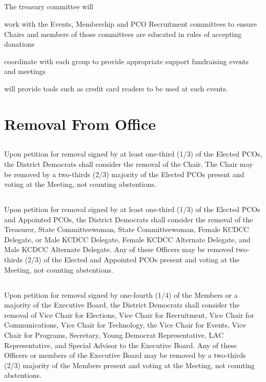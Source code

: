 \subsection{}
The treasury committee will
\begin{inlinealphalist}
    \item work with the Events, Membership and PCO Recruitment committees to ensure Chairs and members of those committees are educated in rules of accepting donations
    \item coordinate with each group to provide appropriate support fundraising events and meetings
    \item will provide tools such as credit card readers to be used at such events.
\end{inlinealphalist}

\section{Removal From Office}
\subsection{}
Upon petition for removal signed by at least one-third (1/3) of the Elected PCOs, the \fortythird{} District Democrats shall consider the removal of the Chair. The Chair may be removed by a two-thirds (2/3) majority of the Elected PCOs present and voting at the Meeting, not counting abstentions.

\subsection{}
Upon petition for removal signed by at least one-third (1/3) of the Elected PCOs and Appointed PCOs, the \fortythird{} District Democrats shall consider the removal of the Treasurer, State Committeewoman, State Committeewoman, Female KCDCC Delegate, or Male KCDCC Delegate, Female KCDCC Alternate Delegate, and Male KCDCC Alternate Delegate. Any of these Officers may be removed two-thirds (2/3) of the Elected and Appointed PCOs present and voting at the Meeting, not counting abstentions.

\subsection{} \label{eb-removal}
Upon petition for removal signed by one-fourth (1/4) of the Members or a majority of the Executive Board, the \fortythird{} District Democrats shall consider the removal of Vice Chair for Elections, Vice Chair for Recruitment, Vice Chair for Communications, Vice Chair for Technology, the Vice Chair for Events, Vice Chair for Programs, Secretary, Young Democrat Representative, LAC Representative, and Special Advisor to the Executive Board. Any of these Officers or members of the Executive Board may be removed by a two-thirds (2/3) majority of the Members present and voting at the Meeting, not counting abstentions.

